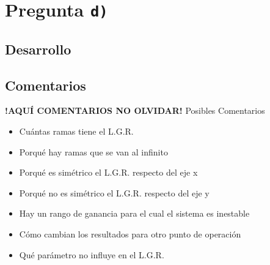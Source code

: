 \section{Pregunta \texttt{d)}}\label{pregunta-d}

\subsection{Desarrollo}




\FloatBarrier
\subsection{Comentarios}


\textbf{!AQUÍ COMENTARIOS NO OLVIDAR!}
Posibles Comentarios
\begin{itemize}
    \item Cuántas ramas tiene el L.G.R.
    \item Porqué hay ramas que se van al infinito
    \item Porqué es simétrico el L.G.R. respecto del eje x
    \item Porqué no es simétrico el L.G.R. respecto del eje y
    \item Hay un rango de ganancia para el cual el sistema es inestable
    \item Cómo cambian los resultados para otro punto de operación
    \item Qué parámetro no influye en el L.G.R.
\end{itemize}